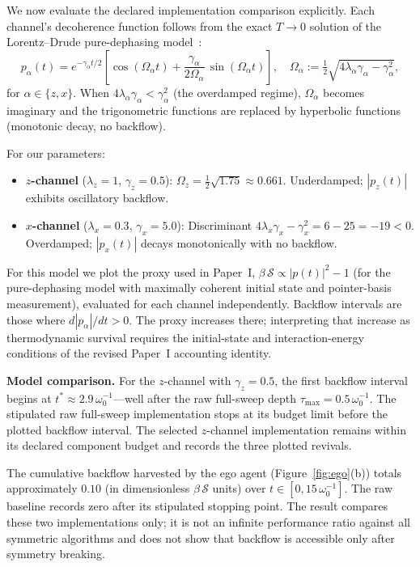 \documentclass[12pt]{article}
\begin{document}
We now evaluate the declared implementation comparison explicitly.
Each channel's decoherence function follows from the exact
$T \to 0$ solution of the Lorentz--Drude pure-dephasing
model~\cite{BreuerPetruccione2002,Liu2026TDOME_I}:
\begin{equation}
\label{eq:decoherence_II}
p_\alpha(t) = e^{-\gamma_\alpha t/2}\!\left[
  \cos(\Omega_\alpha t)
  + \frac{\gamma_\alpha}{2\Omega_\alpha}\,
    \sin(\Omega_\alpha t)
\right],
\quad
\Omega_\alpha
:= \tfrac{1}{2}\sqrt{4\lambda_\alpha\gamma_\alpha
   - \gamma_\alpha^2},
\end{equation}
for $\alpha \in \{z, x\}$.
When $4\lambda_\alpha\gamma_\alpha < \gamma_\alpha^2$
(the overdamped regime), $\Omega_\alpha$ becomes imaginary
and the trigonometric functions are replaced by hyperbolic
functions (monotonic decay, no backflow).

For our parameters:
\begin{itemize}
\item \textbf{$z$-channel} ($\lambda_z = 1$,
  $\gamma_z = 0.5$):
  $\Omega_z = \frac{1}{2}\sqrt{1.75} \approx 0.661$.
  Underdamped; $|p_z(t)|$ exhibits oscillatory backflow.
\item \textbf{$x$-channel} ($\lambda_x = 0.3$,
  $\gamma_x = 5.0$):
  Discriminant $4\lambda_x\gamma_x - \gamma_x^2
  = 6 - 25 = -19 < 0$.
  Overdamped; $|p_x(t)|$ decays monotonically with no
  backflow.
\end{itemize}

For this model we plot the proxy used in Paper~I,
$\beta\,\mathcal{S} \propto |p(t)|^2 - 1$
(for the pure-dephasing model with maximally coherent
initial state and pointer-basis measurement), evaluated
for each channel independently.
Backflow intervals are those where $d|p_\alpha|/dt>0$.  The proxy
increases there; interpreting that increase as thermodynamic survival
requires the initial-state and interaction-energy conditions of the
revised Paper~I accounting identity.

\textbf{Model comparison.}
For the $z$-channel with $\gamma_z = 0.5$, the first
backflow interval begins at
$t^* \approx 2.9\,\omega_0^{-1}$---well after the raw
full-sweep depth $\tau_{\max} = 0.5\,\omega_0^{-1}$.
The stipulated raw full-sweep implementation stops at its budget limit
before the plotted backflow interval.  The selected $z$-channel
implementation remains within its declared component budget and records
the three plotted revivals.

The cumulative backflow harvested by the ego agent
(Figure~\ref{fig:ego}(b)) totals approximately $0.10$
(in dimensionless $\beta\,\mathcal{S}$ units) over
$t \in [0, 15\,\omega_0^{-1}]$.
The raw baseline records zero after its stipulated stopping point.  The
result compares these two implementations only; it is not an infinite
performance ratio against all symmetric algorithms and does not show
that backflow is accessible only after symmetry breaking.
\end{document}
